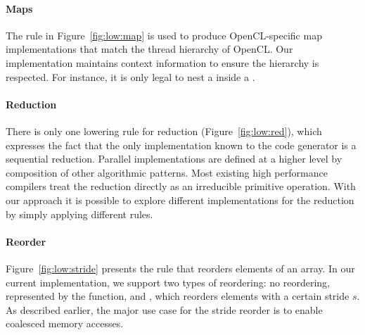 \paragraph{Maps}
The rule in Figure~\ref{fig:low:map} is used to produce OpenCL-specific map implementations that match the thread hierarchy of OpenCL.
Our implementation maintains context information to ensure the hierarchy is respected.
For instance, it is only legal to nest a  inside a .



\paragraph{Reduction}
There is only one lowering rule for reduction (Figure~\ref{fig:low:red}), which expresses the fact that the only implementation known to the code generator is a sequential reduction.
Parallel implementations are defined at a higher level by composition of other algorithmic patterns.
Most existing high performance compilers treat the reduction directly as an irreducible primitive operation.
With our approach it is possible to explore different implementations for the reduction by simply applying different rules.

\paragraph{Reorder}
Figure~\ref{fig:low:stride} presents the rule that reorders elements of an array.
In our current implementation, we support two types of reordering:
no reordering, represented by the  function, and , which reorders elements with a certain stride $s$.
As described earlier, the major use case for the stride reorder is to enable coalesced memory accesses.

